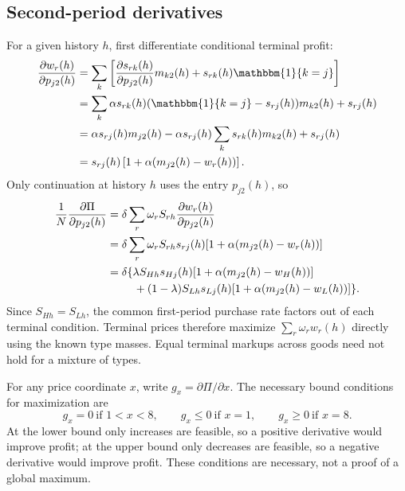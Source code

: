 \documentclass[12pt]{article}
\theoremstyle{definition}
\theoremstyle{remark}
\newcommand{\ind}{\mathbbm{1}}
\numberwithin{equation}{section}
\begin{document}
\subsection{Second-period derivatives}
For a given history $h$, first differentiate conditional terminal profit:
\begin{align}
 \frac{\partial w_r(h)}{\partial p_{j2}(h)}
 &=\sum_k\left[\frac{\partial s_{rk}(h)}{\partial p_{j2}(h)}m_{k2}(h)
                      +s_{rk}(h)\ind\{k=j\}\right]\\
 &=\sum_k\alpha s_{rk}(h)(\ind\{k=j\}-s_{rj}(h))m_{k2}(h)
          +s_{rj}(h)\\
 &=\alpha s_{rj}(h)m_{j2}(h)
       -\alpha s_{rj}(h)\sum_ks_{rk}(h)m_{k2}(h)+s_{rj}(h)\\
 &=s_{rj}(h)\left[1+\alpha(m_{j2}(h)-w_r(h))\right].
\end{align}
Only continuation at history $h$ uses the entry $p_{j2}(h)$, so
\begin{align}
 \frac1N\frac{\partial\Pi}{\partial p_{j2}(h)}
 &=\delta\sum_r\omega_rS_{rh}\frac{\partial w_r(h)}{\partial p_{j2}(h)}\\
 &=\delta\sum_r\omega_rS_{rh}s_{rj}(h)
                   [1+\alpha(m_{j2}(h)-w_r(h))]\\
 &=\delta\{\lambda S_{Hh}s_{Hj}(h)[1+\alpha(m_{j2}(h)-w_H(h))]\notag\\
 &\hspace{2.4em}+(1-\lambda)S_{Lh}s_{Lj}(h)
                         [1+\alpha(m_{j2}(h)-w_L(h))]\}.
\end{align}
Since $S_{Hh}=S_{Lh}$, the common first-period purchase rate factors out
of each terminal condition. Terminal prices therefore maximize
$\sum_r\omega_r w_r(h)$ directly using the known type masses.
Equal terminal markups across goods need not hold for a mixture of types.

For any price coordinate $x$, write $g_x=\partial\Pi/\partial x$.
The necessary bound conditions for maximization are
\[
 g_x=0\ \text{if }1<x<8,\qquad
 g_x\leq0\ \text{if }x=1,\qquad
 g_x\geq0\ \text{if }x=8.
\]
At the lower bound only increases are feasible, so a positive derivative
would improve profit; at the upper bound only decreases are feasible, so a
negative derivative would improve profit. These conditions are necessary,
not a proof of a global maximum.
\end{document}
